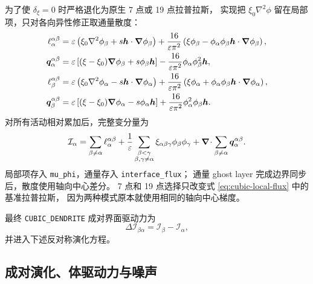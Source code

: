 \documentclass[UTF8,a4paper,11pt]{ctexart}
\newcommand{\grad}{\bm{\nabla}}
\newcommand{\diver}{\bm{\nabla}\!\cdot}
\newcommand{\vct}[1]{\bm{#1}}
\newcommand{\code}[1]{\texttt{#1}}
\begin{document}
为了使 $\delta_\xi=0$ 时严格退化为原生 7 点或 19 点拉普拉斯，
实现把 $\xi_0\nabla^2\phi$ 留在局部项，只对各向异性修正取通量散度：
\begin{align}
 \ell_\alpha^{\alpha\beta}
 &=\varepsilon\left(\xi_0\nabla^2\phi_\beta+s\vct h\cdot\grad\phi_\beta\right)
 +{16\over\varepsilon\pi^2}\left(
 \xi\phi_\beta-\phi_\alpha\phi_\beta\vct h\cdot\grad\phi_\beta\right),\\
 \vct q_\alpha^{\alpha\beta}
 &=\varepsilon\left[(\xi-\xi_0)\grad\phi_\beta+s\phi_\beta\vct h\right]
 -{16\over\varepsilon\pi^2}\phi_\alpha\phi_\beta^2\vct h,\\
 \ell_\beta^{\alpha\beta}
 &=\varepsilon\left(\xi_0\nabla^2\phi_\alpha-s\vct h\cdot\grad\phi_\alpha\right)
 +{16\over\varepsilon\pi^2}\left(
 \xi\phi_\alpha+\phi_\alpha\phi_\beta\vct h\cdot\grad\phi_\alpha\right),\\
 \vct q_\beta^{\alpha\beta}
 &=\varepsilon\left[(\xi-\xi_0)\grad\phi_\alpha-s\phi_\alpha\vct h\right]
 +{16\over\varepsilon\pi^2}\phi_\alpha^2\phi_\beta\vct h.
 \label{eq:cubic-local-flux}
\end{align}
对所有活动相对累加后，完整变分量为
\begin{equation}
 \mathcal I_\alpha=\sum_{\beta\ne\alpha}\ell_\alpha^{\alpha\beta}
 +{1\over\varepsilon}
 \sum_{\substack{\beta<\gamma\\\beta,\gamma\ne\alpha}}
 \xi_{\alpha\beta\gamma}\phi_\beta\phi_\gamma
 +\diver\sum_{\beta\ne\alpha}\vct q_\alpha^{\alpha\beta}.
 \label{eq:cubic-full-var}
\end{equation}
局部项存入 \code{mu\_phi}，通量存入 \code{interface\_flux}；
通量 ghost layer 完成边界同步后，散度使用轴向中心差分。
7 点和 19 点选择只改变式 \eqref{eq:cubic-local-flux} 中的基准拉普拉斯，
因为两种模式原本就使用相同的轴向中心梯度。

最终 \code{CUBIC\_DENDRITE} 成对界面驱动力为
\begin{equation}
 \Delta\mathcal I_{\beta\alpha}=\mathcal I_\beta-\mathcal I_\alpha,
 \label{eq:cubic-pair-var}
\end{equation}
并进入下述反对称演化方程。

\subsection{成对演化、体驱动力与噪声}
\end{document}
